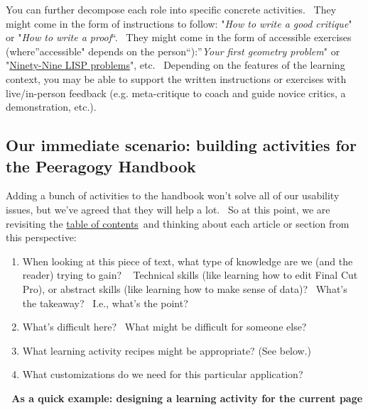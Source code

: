 You can further decompose each role into specific concrete activities.
~They might come in the form of instructions to follow: "\emph{How to
write a good critique}" or "\emph{How to write a proof}``.~ They might
come in the form of accessible exercises (where''accessible" depends on
the person``):''\emph{Your first geometry problem}" or
"\href{http://www.ic.unicamp.br/\%7Emeidanis/courses/mc336/2006s2/funcional/L-99\_Ninety-Nine\_Lisp\_Problems.html}{Ninety-Nine
LISP problems}", etc. ~Depending on the features of the learning
context, you may be able to support the written instructions or
exercises with live/in-person feedback (e.g. meta-critique to coach and
guide novice critics, a demonstration, etc.).

\subsection{Our immediate scenario: building activities for the
Peeragogy Handbook}

Adding a bunch of activities to the handbook won't solve all of our
usability issues, but we've agreed that they will help a lot. ~So at
this point, we are revisiting the
\href{http://peeragogy.org/table-of-contents/}{table of contents}~and
thinking about each article or section from this perspective:

\begin{enumerate}
\item
  When looking at this piece of text, what type of knowledge are we (and
  the reader) trying to gain? ~ Technical skills (like learning how to
  edit Final Cut Pro), or abstract skills (like learning how to make
  sense of data)? ~What's the takeaway?~ I.e., what's the point?
\item
  What's difficult here? ~What might be difficult for someone else?
\item
  What learning activity recipes might be appropriate? (See below.)
\item
  What customizations do we need for this particular application?
\end{enumerate}

\textbf{\emph{~}As a quick example: designing a learning activity for
the current page}

